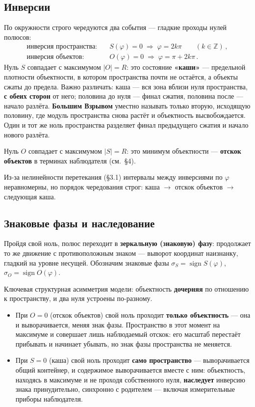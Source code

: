 \documentclass{article}
\begin{document}
\subsection{Инверсии}

По окружности строго чередуются два события --- гладкие проходы нулей полюсов:
\begin{align}
\text{инверсия пространства:} &\quad S(\varphi) = 0 \;\Rightarrow\; \varphi = 2k\pi \qquad (k \in \mathbb{Z})\,, \\
\text{инверсия объектов:} &\quad O(\varphi) = 0 \;\Rightarrow\; \varphi = \pi + 2k\pi\,.
\end{align}
Нуль $S$ совпадает с максимумом $|O| = R$: это состояние \textbf{«каши»} --- предельной плотности объектности, в котором пространства почти не остаётся, а объекты сжаты до предела. Важно различать: каша --- вся зона вблизи нуля пространства, \textbf{с обеих сторон} от него; половина до нуля --- финал сжатия, половина после --- начало разлёта. \textbf{Большим Взрывом} уместно называть только вторую, исходящую половину, где модуль пространства снова растёт и объектность высвобождается. Один и тот же ноль пространства разделяет финал предыдущего сжатия и начало нового разлёта.

Нуль $O$ совпадает с максимумом $|S| = R$: это минимум объектности --- \textbf{отскок объектов} в терминах наблюдателя (см.\ \S4).

Из-за нелинейности перетекания (\S3.1) интервалы между инверсиями по $\varphi$ неравномерны, но порядок чередования строг: каша $\to$ отскок объектов $\to$ следующая каша.

\subsection{Знаковые фазы и наследование}

Пройдя свой ноль, полюс переходит в \textbf{зеркальную (знаковую) фазу}: продолжает то же движение с противоположным знаком --- выворот координат наизнанку, гладкий на уровне несущей. Обозначим знаковые фазы $\sigma_S = \operatorname{sign} S(\varphi)$, $\sigma_O = \operatorname{sign} O(\varphi)$.

Ключевая структурная асимметрия модели: объектность \textbf{дочерняя} по отношению к пространству, и два нуля устроены по-разному.
\begin{itemize}
  \item При $O = 0$ (отскок объектов) свой ноль проходит \textbf{только объектность} --- она и выворачивается, меняя знак фазы. Пространство в этот момент на максимуме и совершает лишь наблюдаемый отскок: его масштаб перестаёт прибывать и начинает убывать, но знак фазы пространства не меняется.
  \item При $S = 0$ (каша) свой ноль проходит \textbf{само пространство} --- выворачивается общий контейнер, и содержимое выворачивается вместе с ним: объектность, находясь в максимуме и не проходя собственного нуля, \textbf{наследует} инверсию знака принудительно, синхронно с родителем --- включая измерительные приборы наблюдателя.
\end{itemize}
\end{document}
